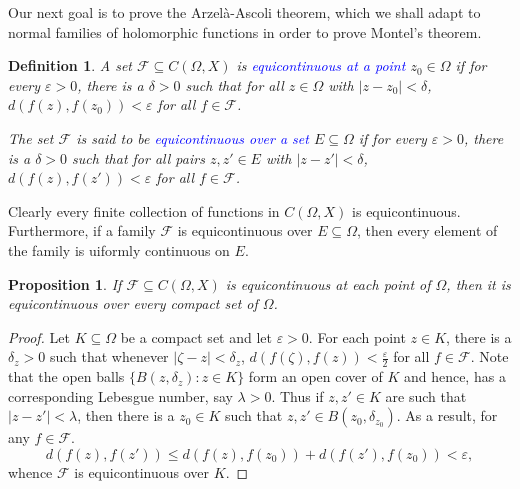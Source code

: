 \documentclass[11pt]{article}
\theoremstyle{thmstyle}
\newtheorem{proposition}[theorem]{Proposition}
\theoremstyle{defstyle}
\newtheorem{definition}[theorem]{Definition}
\newcommand{\scrF}{\mathscr{F}}
\newcommand{\define}[1]{\textcolor{blue}{\textit{#1}}}
\renewcommand{\le}{\leqslant}
\begin{document}
Our next goal is to prove the Arzel\`a-Ascoli theorem, which we shall adapt to normal families of holomorphic functions in order to prove Montel's theorem. 

\begin{definition}
    A set $\scrF\subseteq C(\Omega, X)$ is \define{equicontinuous at a point} $z_0\in\Omega$ if for every $\varepsilon > 0$, there is a $\delta > 0$ such that for all $z\in\Omega$ with $|z - z_0| < \delta$, $d(f(z), f(z_0)) < \varepsilon$ for all $f\in\scrF$.

    The set $\scrF$ is said to be \define{equicontinuous over a set} $E\subseteq\Omega$ if for every $\varepsilon > 0$, there is a $\delta > 0$ such that for all pairs $z, z'\in E$ with $|z - z'| < \delta$, $d(f(z), f(z')) < \varepsilon$ for all $f\in\scrF$.
\end{definition}

Clearly every finite collection of functions in $C(\Omega, X)$ is equicontinuous. Furthermore, if a family $\scrF$ is equicontinuous over $E\subseteq\Omega$, then every element of the family is uiformly continuous on $E$.

\begin{proposition}
    If $\scrF\subseteq C(\Omega, X)$ is equicontinuous at each point of $\Omega$, then it is equicontinuous over every compact set of $\Omega$.
\end{proposition}
\begin{proof}
    Let $K\subseteq\Omega$ be a compact set and let $\varepsilon > 0$. For each point $z\in K$, there is a $\delta_z > 0$ such that whenever $|\zeta - z| < \delta_z$, $d(f(\zeta), f(z)) < \frac{\varepsilon}{2}$ for all $f\in\scrF$. Note that the open balls $\{B(z, \delta_z)\colon z\in K\}$ form an open cover of $K$ and hence, has a corresponding Lebesgue number, say $\lambda > 0$. Thus if $z, z'\in K$ are such that $|z - z'| < \lambda$, then there is a $z_0\in K$ such that $z, z'\in B(z_0, \delta_{z_0})$. As a result, for any $f\in\scrF$.
    \begin{equation*}
        d(f(z), f(z'))\le d(f(z), f(z_0)) + d(f(z'), f(z_0)) < \varepsilon,
    \end{equation*}
    whence $\scrF$ is equicontinuous over $K$.
\end{proof}
\end{document}
